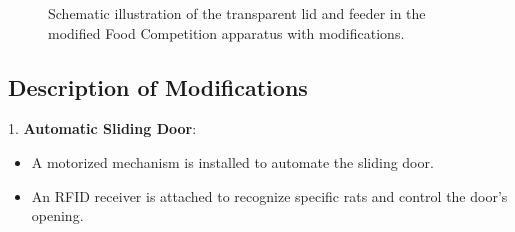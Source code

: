 \documentclass[english, a4paper, 11pt]{article}
\begin{document}
\begin{figure}[h]
    \centering
    \caption{Schematic illustration of the transparent lid and feeder in the modified Food Competition apparatus with modifications.}
    \label{fig:modified_apparatus_homecage_reality}
\end{figure}

\subsection*{Description of Modifications}

1. \textbf{Automatic Sliding Door}:
\begin{itemize}
    \item A motorized mechanism is installed to automate the sliding door.
    \item An RFID receiver is attached to recognize specific rats and control the door's opening.
\end{itemize}
\end{document}
